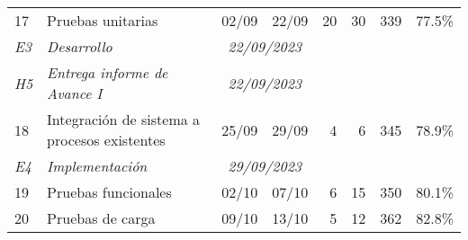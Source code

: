 \begin{longtable}[c]{llccrrrr}
	{\color[HTML]{656565} 17}              & {\color[HTML]{656565} Pruebas unitarias}                               & \multicolumn{1}{l}{{\color[HTML]{656565} 02/09}} & \multicolumn{1}{l}{{\color[HTML]{656565} 22/09}} & {\color[HTML]{656565} 20}         & {\color[HTML]{656565} 30}          & {\color[HTML]{656565} 339}           & {\color[HTML]{656565} 77.5\%}       \\
	\textit{E3}                            & \textit{Desarrollo}                                                    & \multicolumn{2}{c}{\textit{22/09/2023}}          & \textit{}                                        & \textit{}                         & \textit{}                          & \textit{}                                                                  \\
	\textit{H5}                            & \textit{Entrega informe de Avance I}                                   & \multicolumn{2}{c}{\textit{22/09/2023}}          & \textit{}                                        & \textit{}                         & \textit{}                          & \textit{}                                                                  \\
	{\color[HTML]{656565} 18}              & {\color[HTML]{656565} Integración de sistema a procesos existentes}    & {\color[HTML]{656565} 25/09}                     & {\color[HTML]{656565} 29/09}                     & {\color[HTML]{656565} 4}          & {\color[HTML]{656565} 6}           & {\color[HTML]{656565} 345}           & {\color[HTML]{656565} 78.9\%}       \\
	\textit{E4}                            & \textit{Implementación}                                                & \multicolumn{2}{c}{\textit{29/09/2023}}          & \textit{}                                        & \textit{}                         & \textit{}                          & \textit{}                                                                  \\
	{\color[HTML]{656565} 19}              & {\color[HTML]{656565} Pruebas funcionales}                             & {\color[HTML]{656565} 02/10}                     & {\color[HTML]{656565} 07/10}                     & {\color[HTML]{656565} 6}          & {\color[HTML]{656565} 15}          & {\color[HTML]{656565} 350}           & {\color[HTML]{656565} 80.1\%}       \\
	{\color[HTML]{656565} 20}              & {\color[HTML]{656565} Pruebas de carga}                                & {\color[HTML]{656565} 09/10}                     & {\color[HTML]{656565} 13/10}                     & {\color[HTML]{656565} 5}          & {\color[HTML]{656565} 12}          & {\color[HTML]{656565} 362}           & {\color[HTML]{656565} 82.8\%}       \\

\end{longtable}

